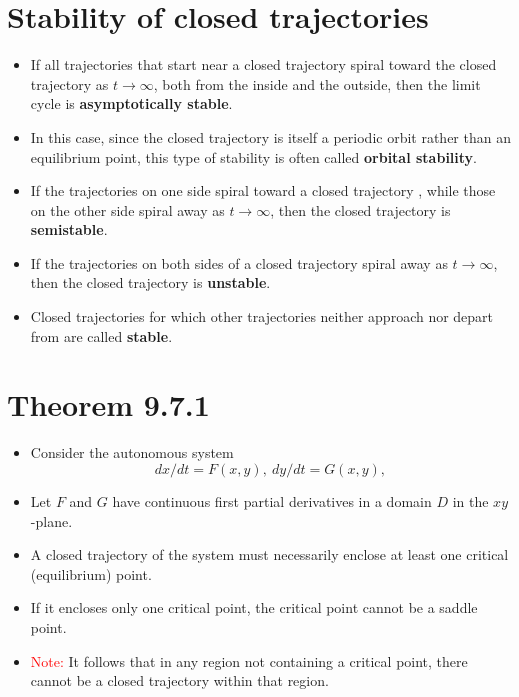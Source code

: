 \documentclass[11pt,a4paper]{article}
\begin{document}
	\section*{Stability of closed trajectories}
	\begin{itemize}
		\item If all trajectories that start near a closed trajectory spiral toward the closed trajectory as $t \to \infty$, both from the inside and the outside, then the limit cycle is \textbf{asymptotically stable}.
		\item In this case, since the closed trajectory is itself a periodic orbit rather than an equilibrium point, this type of stability is often called \textbf{orbital stability}.
		\item If the trajectories on one side spiral toward a closed trajectory , while those on the other side spiral away as $t \to \infty$, then the closed trajectory is \textbf{semistable}.
		\item If the trajectories on both sides of a closed trajectory spiral away as $t \to \infty$, then the closed trajectory is \textbf{unstable}.
		\item Closed trajectories for which other trajectories neither approach nor depart from are called \textbf{stable}.		
	\end{itemize}
	\section*{Theorem 9.7.1}
	\begin{itemize}
		\item Consider the autonomous system
		$$
		dx/dt = F(x,y),\ dy/dt = G(x,y),
		$$
		\item Let $F$ and $G$ have continuous first partial derivatives in a domain $D$ in the $xy$-plane.
		\item A closed trajectory of the system must necessarily enclose at least one critical (equilibrium) point.
		\item If it encloses only one critical point, the critical point cannot be a saddle point.
		\item \textcolor{red}{Note:} It follows that in any region not containing a critical point, there cannot be a closed trajectory within that region. 		
	\end{itemize}
\end{document}
